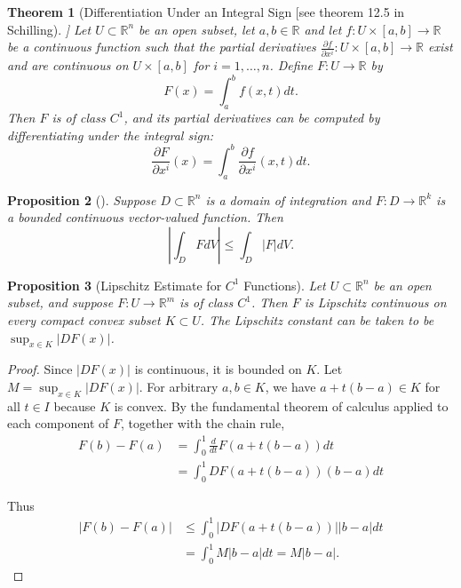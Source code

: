 \documentclass[reqno]{amsart}
\theoremstyle{plain}%
\newtheorem{theorem}{Theorem}[section]
\newtheorem{proposition}[theorem]{Proposition}
\theoremstyle{definition}
\theoremstyle{remark}
\begin{document}
        \begin{theorem}[Differentiation Under an Integral Sign [see theorem 12.5 in
        Schilling]]
        Let $U \subset \mathbb{R}^{n}$ be an open subset, let
        $a,b \in \mathbb{R}$ and let $f  \colon U \times \left[ a,b \right] 
        \to \mathbb{R}$ be a continuous function such that the partial derivatives
        $\frac{\partial f}{\partial x^{i}}  \colon U \times \left[ a,b \right] 
        \to \mathbb{R}$ exist and are continuous on $U \times \left[ a,b \right]
        $ for $i = 1,\ldots, n$. Define $F  \colon U \to \mathbb{R}$ by
        \[
        F(x) = \int_{a}^{b} f(x,t) dt. 
        \] 
        Then $F$ is of class $C^{1}$, and its partial derivatives can be computed
        by differentiating under the integral sign:
        \[
        \frac{\partial F}{\partial x^{i}}(x) = \int_{a}^{b} 
        \frac{\partial f}{\partial x^{i}} \left( x,t \right) dt.
        \] 
        \end{theorem}


        \begin{proposition}[]
        Suppose $D \subset \mathbb{R}^{n}$ is a domain of integration and
        $F  \colon D \to \mathbb{R}^{k}$ is a bounded continuous vector-valued
        function. Then
        \[
        \left| \int_D F dV \right| \le \int_D \left| F \right| dV.
        \] 
        \end{proposition}

        \begin{proposition}[Lipschitz Estimate for $C^{1}$ Functions]
        Let $U \subset \mathbb{R}^{n}$ be an open subset, and suppose
        $F  \colon U \to \mathbb{R}^{m}$ is of class $C^{1}$. Then $F$ is Lipschitz
        continuous on every compact convex subset $K \subset U$. The Lipschitz
        constant can be taken to be $\sup_{x \in K}\left| DF(x) \right| $.
        \end{proposition}


        \begin{proof}
        Since $\left| DF (x) \right| $ is continuous, it is bounded on $K$. Let
        $M = \sup_{x \in K} \left| DF(x) \right| $. For arbitrary $a,b \in K$, we
        have $a+t (b-a) \in K$ for all $t \in I$ because $K$ is convex. By the
        fundamental theorem of calculus applied to each component of $F$, together
        with the chain rule,
        \begin{align*}
            F(b) - F(a) 
            &= \int_{0}^{1} \frac{d}{dt}F\left( a+t(b-a) \right) dt\\
            &= \int_{0}^{1} DF\left( a+t(b-a) \right) (b-a) dt 
        \end{align*}

        Thus
        \begin{align*}
            \left| F(b) - F(a) \right| 
            &\le \int_{0}^{1} \left| DF\left( a+t(b-a) \right)  \right| 
            \left| b-a \right| dt\\
            &= \int_{0}^{1} M \left| b-a \right| dt = M \left| b-a \right|.
        \end{align*}
        \end{proof}
\end{document}
